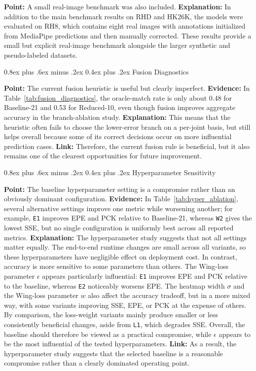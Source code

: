 \documentclass[10pt,letterpaper]{article}
\makeatletter
\renewcommand\subsubsection{\@startsection{subsubsection}{3}{\z@}%
  {0.8ex plus .6ex minus .2ex}%
  {0.4ex plus .2ex}%
  {\normalfont\small\itshape}}
\makeatother
\begin{document}
\medskip
\noindent\textbf{Point:} A small real-image benchmark was also included.  
\textbf{Explanation:} In addition to the main benchmark results on RHD and HK26K, the models were evaluated on RH8, which contains eight real images with annotations initialized from MediaPipe predictions and then manually corrected. These results provide a small but explicit real-image benchmark alongside the larger synthetic and pseudo-labeled datasets.

\subsubsection{Fusion Diagnostics}

\medskip
\noindent\textbf{Point:} The current fusion heuristic is useful but clearly imperfect.  
\textbf{Evidence:} In Table~\ref{tab:fusion_diagnostics}, the oracle-match rate is only about 0.48 for Baseline-21 and 0.53 for Reduced-10, even though fusion improves aggregate accuracy in the branch-ablation study.  
\textbf{Explanation:} This means that the heuristic often fails to choose the lower-error branch on a per-joint basis, but still helps overall because some of its correct decisions occur on more influential prediction cases.  
\textbf{Link:} Therefore, the current fusion rule is beneficial, but it also remains one of the clearest opportunities for future improvement.

\subsubsection{Hyperparameter Sensitivity}

\medskip
\noindent\textbf{Point:} The baseline hyperparameter setting is a compromise rather than an obviously dominant configuration.  
\textbf{Evidence:} In Table~\ref{tab:hyper_ablation}, several alternative settings improve one metric while worsening another; for example, \texttt{E1} improves EPE and PCK relative to Baseline-21, whereas \texttt{W2} gives the lowest SSE, but no single configuration is uniformly best across all reported metrics.  
\textbf{Explanation:} The hyperparameter study suggests that not all settings matter equally. The end-to-end runtime changes are small across all variants, so these hyperparameters have negligible effect on deployment cost. In contrast, accuracy is more sensitive to some parameters than others. The Wing-loss parameter \(\epsilon\) appears particularly influential: \texttt{E1} improves EPE and PCK relative to the baseline, whereas \texttt{E2} noticeably worsens EPE. The heatmap width \(\sigma\) and the Wing-loss parameter \(w\) also affect the accuracy tradeoff, but in a more mixed way, with some variants improving SSE, EPE, or PCK at the expense of others. By comparison, the loss-weight variants mainly produce smaller or less consistently beneficial changes, aside from \texttt{L1}, which degrades SSE. Overall, the baseline should therefore be viewed as a practical compromise, while \(\epsilon\) appears to be the most influential of the tested hyperparameters.  
\textbf{Link:} As a result, the hyperparameter study suggests that the selected baseline is a reasonable compromise rather than a clearly dominated operating point.
\end{document}
